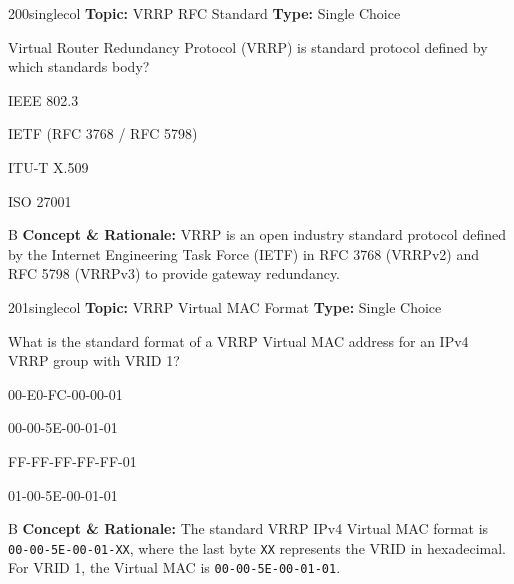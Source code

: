 \begin{qcard}{200}{singlecol}
\textcolor{darkslate!75}{\small\textbf{Topic:} VRRP RFC Standard \hfill \textbf{Type:} Single Choice}\vspace{0.4em}\par
Virtual Router Redundancy Protocol (VRRP) is standard protocol defined by which standards body?
\begin{qoptions}
\item IEEE 802.3
\item IETF (RFC 3768 / RFC 5798)
\item ITU-T X.509
\item ISO 27001
\end{qoptions}
\end{qcard}
\nopagebreak
\begin{explainbox}{B}
\textbf{Concept \& Rationale:} VRRP is an open industry standard protocol defined by the Internet Engineering Task Force (IETF) in RFC 3768 (VRRPv2) and RFC 5798 (VRRPv3) to provide gateway redundancy.
\end{explainbox}

\begin{qcard}{201}{singlecol}
\textcolor{darkslate!75}{\small\textbf{Topic:} VRRP Virtual MAC Format \hfill \textbf{Type:} Single Choice}\vspace{0.4em}\par
What is the standard format of a VRRP Virtual MAC address for an IPv4 VRRP group with VRID 1?
\begin{qoptions}
\item 00-E0-FC-00-00-01
\item 00-00-5E-00-01-01
\item FF-FF-FF-FF-FF-01
\item 01-00-5E-00-01-01
\end{qoptions}
\end{qcard}
\nopagebreak
\begin{explainbox}{B}
\textbf{Concept \& Rationale:} The standard VRRP IPv4 Virtual MAC format is \texttt{00-00-5E-00-01-XX}, where the last byte \texttt{XX} represents the VRID in hexadecimal. For VRID 1, the Virtual MAC is \texttt{00-00-5E-00-01-01}.
\end{explainbox}

